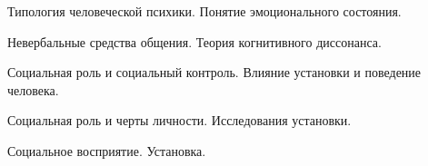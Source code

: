 \documentclass[
	14pt,
	a4paper,
	]
	{scrartcl}
\begin{document}
\vfill
\z Типология человеческой психики.
 \vfill
\z Понятие эмоционального состояния.
 \vfill

\vfill

\newpage


\shapk
{}
\setcounter{zad}{0}

\vfill
\z Невербальные средства общения.
 \vfill
\z Теория когнитивного диссонанса.
 \vfill

\vfill

\newpage


\shapk
{}
\setcounter{zad}{0}

\vfill
\z Социальная роль и социальный контроль.
 \vfill
\z Влияние установки и поведение человека.
 \vfill

\vfill

\newpage


\shapk
{}
\setcounter{zad}{0}

\vfill
\z Социальная роль и черты личности.
 \vfill
\z Исследования установки.
 \vfill

\vfill

\newpage


\shapk
{}
\setcounter{zad}{0}

\vfill
\z Социальное восприятие.
 \vfill
\z Установка.
 \vfill

\vfill

\newpage
\end{document}
